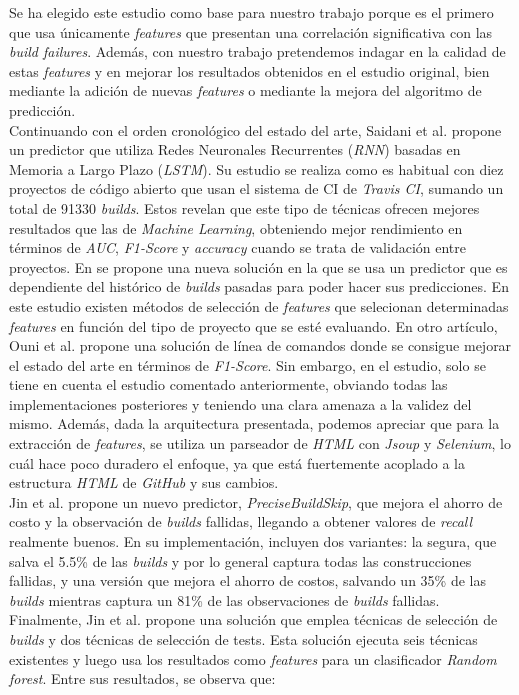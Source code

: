Se ha elegido este estudio \cite{2} como base para nuestro trabajo porque es el primero que usa
únicamente \textit{features} que presentan una correlación significativa con las \textit{build
failures}. Además, con nuestro trabajo pretendemos indagar en la calidad de estas \textit{features}
y en mejorar los resultados obtenidos en el estudio original, bien mediante la adición de nuevas
\textit{features} o mediante la mejora del algoritmo de predicción.\\

Continuando con el orden cronológico del estado del arte, Saidani et al. \cite{15} propone un
predictor que utiliza Redes Neuronales Recurrentes (\textit{RNN}) basadas en Memoria a Largo
Plazo (\textit{LSTM}). Su estudio se realiza como es habitual con diez proyectos de código
abierto que usan el sistema de CI de \textit{Travis CI}, sumando un total de 91330
\textit{builds}. Estos revelan que este tipo de técnicas ofrecen mejores resultados
que las de \textit{Machine Learning}, obteniendo mejor rendimiento en términos de \textit{AUC},
\textit{F1-Score} y \textit{accuracy} cuando se trata de validación entre proyectos. En \cite{6}
se propone una nueva solución en la que se usa un predictor que es dependiente del histórico de
\textit{builds} pasadas para poder hacer sus predicciones. En este estudio existen métodos de
selección de \textit{features} que selecionan determinadas \textit{features} en función del tipo
de proyecto que se esté evaluando. En otro artículo, Ouni et al. \cite{14} propone una solución
de línea de comandos donde se consigue mejorar el estado del arte en términos de \textit{F1-Score}.
Sin embargo, en el estudio, solo se tiene en cuenta el estudio \cite{7} comentado anteriormente,
obviando todas las implementaciones posteriores y teniendo una clara amenaza a la validez del
mismo. Además, dada la arquitectura presentada, podemos apreciar que para la extracción de
\textit{features}, se utiliza un parseador de \textit{HTML} con \textit{Jsoup} y \textit{Selenium},
lo cuál hace poco duradero el enfoque, ya que está fuertemente acoplado a la estructura
\textit{HTML} de \textit{GitHub} y sus cambios. \\

Jin et al. \cite{4} propone un nuevo predictor, \textit{PreciseBuildSkip}, que mejora el ahorro
de costo y la observación de \textit{builds} fallidas, llegando a obtener valores de
\textit{recall} realmente buenos. En su implementación, incluyen dos variantes: la segura, que
salva el 5.5\% de las \textit{builds} y por lo general captura todas las construcciones fallidas,
y una versión que mejora el ahorro de costos, salvando un 35\% de las \textit{builds} mientras
captura un 81\% de las observaciones de \textit{builds} fallidas. Finalmente, Jin et al. \cite{1} propone
una solución que emplea técnicas de selección de \textit{builds} y dos técnicas de selección de
tests. Esta solución ejecuta seis técnicas existentes y luego usa los resultados como
\textit{features} para un clasificador \textit{Random forest}. Entre sus resultados, se observa
que:

